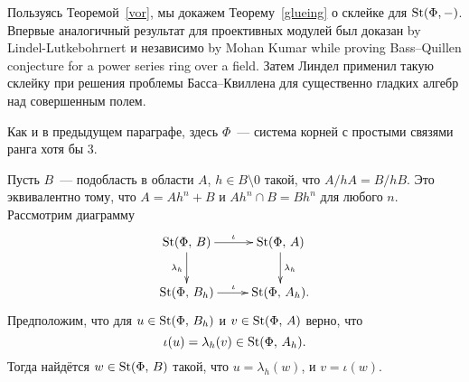 \documentclass[oneside, 11pt]{amsart}
\begin{document}
Пользуясь Теоремой~\ref{vor}, мы докажем Теорему~\ref{glueing} о склейке для $\mathop{\mathrm{St}}\nolimits(\Phi,-)$. Впервые аналогичный результат для проективных модулей был доказан by Lindel-Lutkebohrnert и независимо by Mohan Kumar while proving Bass--Quillen conjecture for a power series ring over a field. Затем Линдел применил такую склейку при решения проблемы Басса--Квиллена для существенно гладких алгебр над совершенным полем.

Как и в предыдущем параграфе, здесь $\Phi$~--- система корней с простыми связями ранга хотя бы 3.

\begin{theorem}
\label{glueing}
Пусть $B$~--- подобласть в области $A$, $h\in B\setminus0$ такой, что $A / hA = B / hB$. Это эквивалентно тому, что $A = Ah^n + B$ и $Ah^n \cap B = Bh^n$ для любого $n$. Рассмотрим диаграмму
$$
\xymatrix{
\St(\Phi,\,B)\ar[r]^{\iota}\ar[d]_{\lambda_h}&\St(\Phi,\,A)\ar[d]^{\lambda_h}\\
\St(\Phi,\,B_h)\ar[r]^{\iota}&\St(\Phi,\,A_h).
}
$$
Предположим, что для $u\in\mathop{\mathrm{St}}\nolimits(\Phi,\,B_h)$ и $v\in\mathop{\mathrm{St}}\nolimits(\Phi,\,A)$ верно, что $$\iota(u)=\lambda_h(v)\in\mathop{\mathrm{St}}\nolimits(\Phi,\,A_h).$$
Тогда найдётся $w\in\mathop{\mathrm{St}}\nolimits(\Phi,\,B)$ такой, что $u=\lambda_h(w)$, и $v=\iota(w)$.
\end{theorem}
\end{document}
